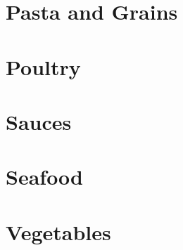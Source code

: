 \documentclass{report}
\begin{document}
    \chapter{Pasta and Grains}

    
    
    
    
    
    
    
    
    

    \chapter{Poultry}

    
    
    
    
    
    

    \chapter{Sauces}
    
    
    

    \chapter{Seafood}

    
    
    
    
    
    
    
    

    \chapter{Vegetables}
    
    
    
    
    
    
    
    
    
    
    
\end{document}
